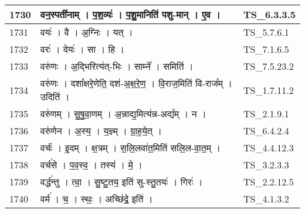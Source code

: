 \documentclass[17pt]{extarticle}
\begin{document}
\begin{longtable}{||p{0.4in}||p{4.9in}||p{0.9in}||}
    \hline
        
    1730 & वन॒स्पती॑नाम्   ।   प॒श॒व्यः॑   ।   प॒शु॒मानिति॑ पशु{-}मान्   ।   ए॒व   ।    & TS\_6.3.3.5       \\
    
    \hline
        
    1731 & वयः॑   ।   वै   ।   अ॒ग्निः   ।   यत्   ।    & TS\_5.7.6.1       \\
    
    \hline
        
    1732 & वरः॑   ।   देयः॑   ।   सा   ।   हि   ।    & TS\_7.1.6.5       \\
    
    \hline
        
    1733 & वरु॑णः   ।   अ॒द्भिरित्य॑त्{-}भिः   ।   साम्ने᳚   ।   समिति॑   ।    & TS\_7.5.23.2       \\
    
    \hline
        
    1734 & वरु॑णः   ।   दशा᳚क्षरे॒णेति॒ दश॑{-}अ॒क्ष॒रे॒ण॒   ।   वि॒राज॒मिति॑ वि{-}राज᳚म्   ।   उदिति॑   ।    & TS\_1.7.11.2       \\
    
    \hline
        
    1735 & वरु॑णम्   ।   सु॒षु॒वा॒णम्   ।   अ॒न्नाद्य॒मित्य॑न्न{-}अद्य᳚म्   ।   न   ।    & TS\_2.1.9.1       \\
    
    \hline
        
    1736 & वरु॑णेन   ।   अ॒स्य॒   ।   य॒ज्ञ्म्   ।   ग्रा॒ह॒ये॒त्   ।    & TS\_6.4.2.4       \\
    
    \hline
        
    1737 & वर्चः॑   ।   इ॒दम्   ।   क्ष॒त्रम्   ।   स॒लि॒लवा॑त॒मिति॑ सलि॒ल{-}वा॒त॒म्   ।    & TS\_4.4.12.3       \\
    
    \hline
        
    1738 & वर्च॑से   ।   प॒व॒स्व॒   ।   तस्य॑   ।   मे॒   ।    & TS\_3.2.3.3       \\
    
    \hline
        
    1739 & वर्द्ध॑न्तु   ।   त्वा॒   ।   सु॒ष्टु॒तय॒ इति॑ सु{-}स्तु॒तयः॑   ।   गिरः॑   ।    & TS\_2.2.12.5       \\
    
    \hline
        
    1740 & वर्म॑   ।   च॒   ।   स्थः॒   ।   अच्छि॑द्रे॒ इति॑   ।    & TS\_4.1.3.2       \\
    

\end{longtable}
\end{document}
